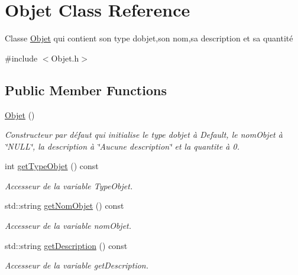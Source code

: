 \hypertarget{class_objet}{}\section{Objet Class Reference}
\label{class_objet}


Classe \hyperlink{class_objet}{Objet} qui contient son type d\textquotesingle{}objet,son nom,sa description et sa quantité  




{\ttfamily \#include $<$Objet.\+h$>$}

\subsection*{Public Member Functions}
\begin{DoxyCompactItemize}
\item 
\mbox{\label{class_objet_aefdd826d50085897e4894ffef4597d04}} 
\hyperlink{class_objet_aefdd826d50085897e4894ffef4597d04}{Objet} ()
\begin{DoxyCompactList}\small\item\em Constructeur par défaut qui initialise le type d\textquotesingle{}objet à Default, le nom\+Objet à \char`\"{}\+N\+U\+L\+L\char`\"{}, la description à \char`\"{}\+Aucune description\char`\"{} et la quantite à 0. \end{DoxyCompactList}\item 
int \hyperlink{class_objet_ab75ba7bf1170582a4d50ba8848be2848}{get\+Type\+Objet} () const
\begin{DoxyCompactList}\small\item\em Accesseur de la variable Type\+Objet. \end{DoxyCompactList}\item 
std\+::string \hyperlink{class_objet_a29be0a2d83cdebac4fedd495e3824515}{get\+Nom\+Objet} () const
\begin{DoxyCompactList}\small\item\em Accesseur de la variable nom\+Objet. \end{DoxyCompactList}\item 
std\+::string \hyperlink{class_objet_aabd73e4b97e5fb14da9a2e4cf7899f97}{get\+Description} () const
\begin{DoxyCompactList}\small\item\em Accesseur de la variable get\+Description. \end{DoxyCompactList}\item 

\end{DoxyCompactItemize}
